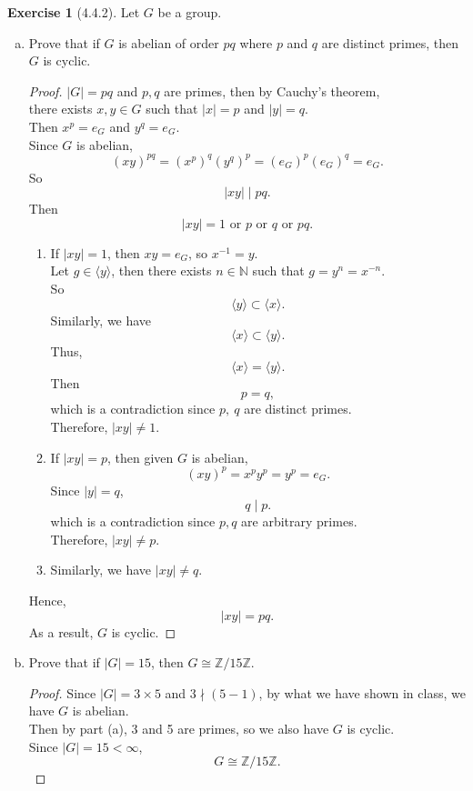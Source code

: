 \documentclass{amsart}
\newcommand{\bbn}{\mathbb{N}}
\theoremstyle{plain}
\theoremstyle{definition}
\newtheorem{exer}[lem]{Exercise}
\begin{document}
\begin{exer}[4.4.2]
Let $G$ be a group.
\begin{enumerate}[(a)]
\item Prove that if $G$ is  abelian  of order $pq$ where $p$ and $q$ are distinct primes, then $G$ is cyclic.
	\begin{proof}	
	$|G| = pq$ and $p,q$ are primes, then by Cauchy's theorem,\\
	there exists $x,y \in G$ such that $|x|=p$ and $|y|=q$.\\
	Then $x^p = e_G$ and $y^q = e_G$.\\
	Since $G$ is abelian,\\
	\[(xy)^{pq} = (x^p)^q (y^q)^p = (e_G)^p(e_G)^q = e_G.\]
	So 
	\[|xy| \mid  {pq}.\]
	Then 
	\[|xy| = 1 \text{ or } p \text{ or }  q \text{ or } pq.\]
	\begin{enumerate}
	  \item If $|xy| = 1$, then $xy = e_G$, so $x^{-1} = y$.\\
	  	Let $g \in \langle y\rangle$, then there exists $n \in \bbn$ such that $g = y^n = x^{-n}$.\\
	  	So 
	  	\[\langle y \rangle \subset \langle x \rangle.\]
		Similarly, we have 
		\[ \langle x \rangle \subset \langle y \rangle.\]
		Thus,
	  	\[\langle x \rangle = \langle y \rangle.\]
		Then
		\[p = q,\]
		which is a contradiction since $p,\ q$ are distinct primes.\\
		Therefore, $|xy| \neq 1$.
	  \item
	  	If $|xy| = p$, then given $G$ is abelian,
	  	\[(xy)^p = x^py^p = y^p = e_G.\]
	  	Since $|y| = q$,
	  	\[q\mid p.\]
	  	which is a contradiction since $p, q$ are arbitrary primes.\\
	  	Therefore, $|xy| \neq p$.
	  	\item
	  	 Similarly, we have $|xy| \neq q$.
	  \end{enumerate}
	  Hence, \[|xy| = pq.\]
	As a result, $G$ is cyclic.
	\end{proof}

\item Prove that if $|G|=15$, then $G\cong\mathbb Z/15\mathbb Z$.
  	\begin{proof}
  	  Since $|G| = 3\times 5$ and $3 \nmid (5-1)$, by what we have shown in class, we have $G$ is abelian.\\
  	  Then by part (a), 3 and 5 are primes, so we also have $G$ is cyclic.\\
  	  Since $|G| = 15 < \infty$, 
  	  \[G \cong\mathbb Z/15\mathbb Z. \]
  	\end{proof}
\end{enumerate}
\end{exer}
\end{document}
